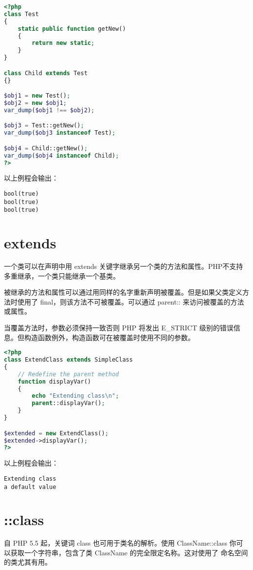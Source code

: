 \begin{lstlisting}[language=PHP]
<?php
class Test
{
    static public function getNew()
    {
        return new static;
    }
}

class Child extends Test
{}

$obj1 = new Test();
$obj2 = new $obj1;
var_dump($obj1 !== $obj2);

$obj3 = Test::getNew();
var_dump($obj3 instanceof Test);

$obj4 = Child::getNew();
var_dump($obj4 instanceof Child);
?>
\end{lstlisting}

以上例程会输出：

\begin{verbatim}
bool(true)
bool(true)
bool(true)
\end{verbatim}


\section{extends}

一个类可以在声明中用 extends 关键字继承另一个类的方法和属性。PHP不支持多重继承，一个类只能继承一个基类。

被继承的方法和属性可以通过用同样的名字重新声明被覆盖。但是如果父类定义方法时使用了 final，则该方法不可被覆盖。可以通过 parent:: 来访问被覆盖的方法或属性。

当覆盖方法时，参数必须保持一致否则 PHP 将发出 E\_STRICT 级别的错误信息。但构造函数例外，构造函数可在被覆盖时使用不同的参数。


\begin{lstlisting}[language=PHP]
<?php
class ExtendClass extends SimpleClass
{
    // Redefine the parent method
    function displayVar()
    {
        echo "Extending class\n";
        parent::displayVar();
    }
}

$extended = new ExtendClass();
$extended->displayVar();
?>
\end{lstlisting}

以上例程会输出：

\begin{verbatim}
Extending class
a default value
\end{verbatim}


\section{::class}

自 PHP 5.5 起，关键词 class 也可用于类名的解析。使用 ClassName::class 你可以获取一个字符串，包含了类 ClassName 的完全限定名称。这对使用了 命名空间 的类尤其有用。


